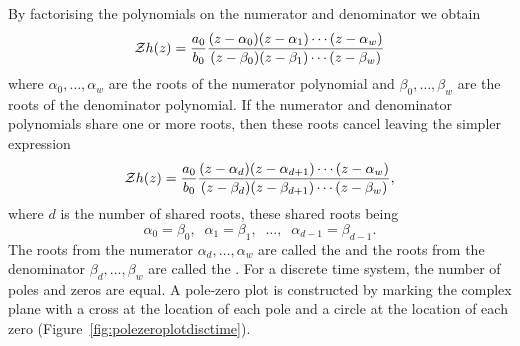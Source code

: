 By factorising the polynomials on the numerator and denominator we obtain
\[
{\mathcal Z} h(z) = \frac{a_0}{b_0} \frac{(z-\alpha_0)(z - \alpha_1)\cdots(z - \alpha_{w})}{(z-\beta_0)(z - \beta_1)\cdots(z - \beta_{w})}
\]
where $\alpha_0, \dots, \alpha_w$ are the roots of the numerator polynomial and $\beta_0, \dots, \beta_w$ are the roots of the denominator polynomial.  If the numerator and denominator polynomials share one or more roots, then these roots cancel leaving the simpler expression
\begin{equation}\label{eq:ztransfuncpoleszeros}
{\mathcal Z} h(z) = \frac{a_0}{b_0} \frac{(z-\alpha_d)(z - \alpha_{d+1})\cdots(z - \alpha_{w})}{(z-\beta_d)(z - \beta_{d+1})\cdots(z - \beta_{w})},
\end{equation}
where $d$ is the number of shared roots, these shared roots being 
\[
\alpha_0 = \beta_0, \;\; \alpha_1 = \beta_1, \;\; \dots, \;\;  \alpha_{d-1} = \beta_{d-1}.
\]
The roots from the numerator $\alpha_d, \dots, \alpha_w$ are called the  and the roots from the denominator $\beta_d, \dots, \beta_w$ are called the .  For a discrete time system, the number of poles and zeros are equal.   A pole-zero plot is constructed by marking the complex plane with a cross at the location of each pole and a circle at the location of each zero (Figure~\ref{fig:polezeroplotdisctime}). %

